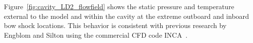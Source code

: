 Figure~\ref{fig:cavity_LD2_flowfield} shows the static pressure and temperature external to the model and within the cavity at the extreme outboard and inboard bow shock locations. This behavior is consistent with previous research by Engblom and Silton using the commercial CFD code INCA~\cite{engblom_goldstein_AIAA-1996-667,silton_goldstein_JFM}.
\begin{figure}[hbtp]
  \begin{center}
     \\

\end{center}
\end{figure}
